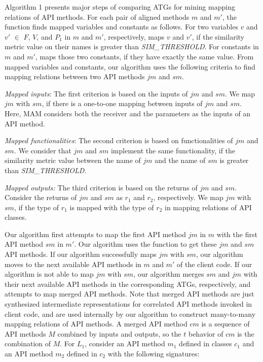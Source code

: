 Algorithm 1 presents major steps of comparing ATGs for mining
mapping relations of API methods. For each pair of aligned methods $m$ and $m'$, the  function finds mapped variables and constants as follows. For two variables $v$ and $v'$ $\in$ $F$, $V$, and $P_1$ in $m$ and $m'$, respectively,
 maps $v$ and $v'$, if the similarity metric value on their names is greater
than \emph{SIM\_THRESHOLD}. For constants in $m$ and $m'$, 
maps those two constants, if they have exactly the same
value. From mapped variables and constants, our algorithm uses the following criteria to find mapping relations between two API methods $jm$ and $sm$.

\emph{Mapped inputs}: The first criterion is based on the inputs
of $jm$ and $sm$. We map $jm$ with $sm$, if there is a one-to-one
mapping between inputs of $jm$ and $sm$. Here, MAM
considers both the receiver and the parameters as the inputs of an
API method.

\emph{Mapped functionalities}: The second criterion is based on functionalities of
$jm$ and $sm$. We consider that $jm$ and $sm$ implement the same functionality,
if the similarity metric value between the name of $jm$ and the name of $sm$ is
greater than \emph{SIM\_THRESHOLD}.

\emph{Mapped outputs:} The third criterion is based on the returns of $jm$ and $sm$.
Consider the returns of $jm$ and $sm$ as $r_1$ and $r_2$, respectively. We map $jm$
with $sm$, if the type of $r_1$ is mapped with the type of $r_2$ in
mapping relations of API classes.

Our algorithm first attempts to map the first API method $jm$ in $m$
with the first API method $sm$ in $m'$. Our algorithm uses the 
function to get these $jm$ and $sm$ API methods. If our algorithm successfully maps $jm$ with
$sm$, our algorithm moves to the next available API methods in $m$
and $m'$ of the client code. If our algorithm is not able to map $jm$
with $sm$, our algorithm merges $sm$ and $jm$ with their next available API methods
in the corresponding ATGs, respectively, and attempts to map merged API methods. Note that merged API methods are just synthesized intermediate representations for correlated API methods invoked in client code, and are used internally by our algorithm to construct many-to-many mapping relations of API methods. A merged API method $cm$ is a sequence of API
methods $M$ combined by inputs and outputs, so the $t$ behavior of
$cm$ is the combination of $M$. For $L_1$, consider an API method $m_1$ defined in classes $c_1$ and an API method $m_2$ defined in $c_2$ with the following signatures:

